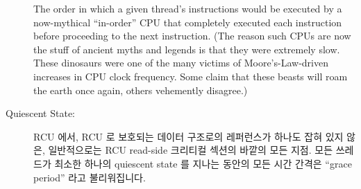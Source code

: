 \begin{description}
	The order in which a given thread's instructions
	would be executed by a now-mythical ``in-order'' CPU that
	completely executed each instruction before proceeding to
	the next instruction.
	(The reason such CPUs are now the stuff of ancient myths
	and legends is that they were extremely slow.
	These dinosaurs were one of the many victims of
	Moore's-Law-driven increases in CPU clock frequency.
	Some claim that these beasts will roam the earth once again,
	others vehemently disagree.)
	\fi
\item[Quiescent State:]
	RCU 에서, RCU 로 보호되는 데이터 구조로의 레퍼런스가 하나도 잡혀 있지
	않은, 일반적으로는 RCU read-side 크리티컬 섹션의 바깥의 모든 지점.
	모든 쓰레드가 최소한 하나의 quiescent state 를 지나는 동안의 모든 시간
	간격은 ``grace period'' 라고 불리워집니다.
	\iffalse


\end{description}
